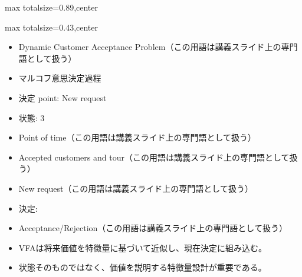 \begin{minipage}[t]{0.58\textwidth}
\begin{adjustbox}{max totalsize={\textwidth}{0.89\textheight},center}
\begin{minipage}{\textwidth}
\end{minipage}
\end{adjustbox}
\end{minipage}


\clearpage
{}
\begin{minipage}[t]{0.405\textwidth}
\begin{adjustbox}{max totalsize={\textwidth}{0.43\textheight},center}
\begin{minipage}{\textwidth}\scriptsize
{}\begin{itemize}
\item Dynamic Customer Acceptance Problem（この用語は講義スライド上の専門語として扱う）
\item マルコフ意思決定過程
\item 決定 point: New request
\item 状態: 3
\item Point of time（この用語は講義スライド上の専門語として扱う）
\item Accepted customers and tour（この用語は講義スライド上の専門語として扱う）
\item New request（この用語は講義スライド上の専門語として扱う）
\item 決定:
\item Acceptance/Rejection（この用語は講義スライド上の専門語として扱う）
\end{itemize}\begin{itemize}
\item VFAは将来価値を特徴量に基づいて近似し、現在決定に組み込む。
\item 状態そのものではなく、価値を説明する特徴量設計が重要である。
\end{itemize}
\end{minipage}
\end{adjustbox}
\end{minipage}\hfill
